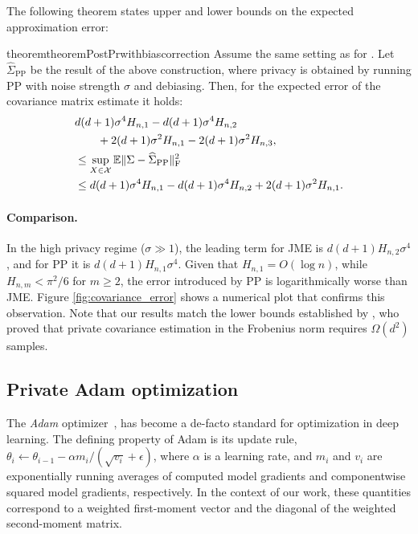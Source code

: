 The following theorem states upper and lower bounds on the expected approximation error:
%
\begin{restatable}{theorem}{theoremPostPrwithbiascorrection}
\label{thm:PostPr_with_bias_corr}
Assume the same setting as for . 
%
Let $\widehat{\Sigma}_{\text{PP}}$ be the result of the above construction, 
where privacy is obtained by running PP with noise strength $\sigma$ and debiasing. 
%
Then, for the expected error of %
the covariance matrix estimate it holds:
\begin{align}
     &d(d + 1 )\sigma^4 H_{n, 1} -d(d + 1)\sigma^4 H_{n, 2} \notag\\
     &\qquad + 2(d + 1)\sigma^2 H_{n, 1}- 2(d + 1)\sigma^2 H_{n, 3}, \notag
     \\
     &\leq\sup_{X \in \mathcal{X}}\mathbb{E}\|\Sigma - \widehat{\Sigma}_{\text{PP}}\|_{\text{F}}^2
     \\
     &\leq d(d + 1)\sigma^4 H_{n, 1} -d(d + 1)\sigma^4 H_{n, 2} + 2(d + 1)\sigma^2 H_{n, 1}.\notag
\end{align}
\end{restatable}

\paragraph{Comparison.}
%
In the high privacy regime ($\sigma \gg 1$), the leading term for JME is $d(d+1)H_{n, 2} \sigma^4$, and for PP it is $d(d + 1)H_{n, 1} \sigma^4$. 
%
Given that $H_{n,1}=O(\log n)$, while $H_{n,m}< \pi^2/6$ for $m\geq 2$, 
the error introduced by PP is logarithmically worse than JME. 
%
Figure \ref{fig:covariance_error} shows a numerical plot that confirms this observation. 
%
Note that our results match the lower bounds established by \citet{dp_covariance_lower_bound}, 
who proved that private covariance estimation in the Frobenius norm requires $\Omega(d^2)$ samples.

\subsection{Private Adam optimization}

The \emph{Adam} optimizer~\citep{kingma2014adam}, has become a de-facto standard 
for optimization in deep learning.
%
The defining property of Adam is its update rule, 
$\theta_{i} \leftarrow \theta_{i-1} - \alpha m_i / (\sqrt{v_i} +\epsilon)$, 
where $\alpha$ is a learning rate, and $m_i$ and $v_i$ are exponentially 
running averages of computed model gradients and 
componentwise squared model gradients, respectively.
%
In the context of our work,  these quantities correspond to a weighted 
first-moment vector and the diagonal of the weighted second-moment matrix. 


